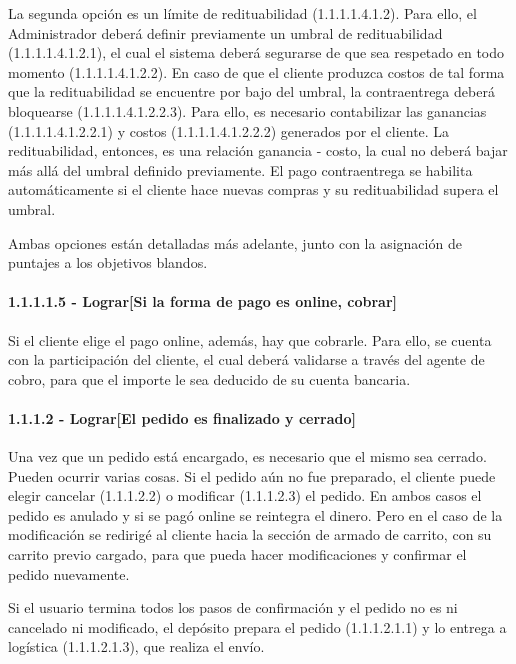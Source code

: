 La segunda opción es un límite de redituabilidad (1.1.1.1.4.1.2).
Para ello, el Administrador deberá definir previamente un umbral de
redituabilidad (1.1.1.1.4.1.2.1), el cual el sistema deberá segurarse de que sea
respetado en todo momento (1.1.1.1.4.1.2.2). En caso de que el cliente produzca
costos de tal forma que la redituabilidad se encuentre por bajo del umbral, la
contraentrega deberá bloquearse (1.1.1.1.4.1.2.2.3). Para ello, es necesario
contabilizar las ganancias (1.1.1.1.4.1.2.2.1) y costos (1.1.1.1.4.1.2.2.2)
generados por el cliente. La redituabilidad, entonces, es una relación
ganancia - costo, la cual no deberá bajar más allá del umbral definido
previamente. El pago contraentrega se habilita automáticamente si el cliente
hace nuevas compras y su redituabilidad supera el umbral.

Ambas opciones están detalladas más adelante, junto con la asignación de
puntajes a los objetivos blandos.

\paragraph{1.1.1.1.5 - Lograr[Si la forma de pago es online, cobrar]} \label{para:1.1.1.1.5}

Si el cliente elige el pago online, además, hay que cobrarle. Para ello, se
cuenta con la participación del cliente, el cual deberá validarse a través del
agente de cobro, para que el importe le sea deducido de su cuenta bancaria.

\clearpage
\paragraph{1.1.1.2 - Lograr[El pedido es finalizado y cerrado]} \label{para:1.1.1.2}

Una vez que un pedido está encargado, es necesario que el mismo sea cerrado.
Pueden ocurrir varias cosas.
Si el pedido aún no fue preparado, el cliente puede elegir cancelar (1.1.1.2.2)
o modificar (1.1.1.2.3) el pedido. En ambos casos el pedido es anulado y si
se pagó online se reintegra el dinero. Pero en el caso de la modificación
se redirigé al cliente hacia la sección de armado de carrito, con su carrito
previo cargado, para que pueda hacer modificaciones y confirmar el pedido
nuevamente.

Si el usuario termina todos los pasos de confirmación y el pedido no es ni
cancelado ni modificado, el depósito prepara el pedido (1.1.1.2.1.1) y lo
entrega a logística (1.1.1.2.1.3), que realiza el envío.

